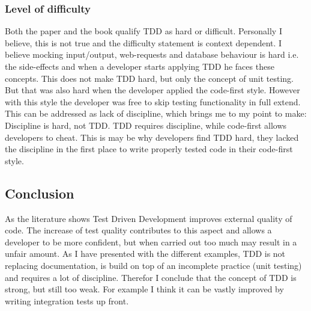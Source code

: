 \subsubsection*{Level of difficulty}

Both the paper and the book qualify TDD as hard or difficult. Personally I believe, this is not true and the
difficulty statement is context dependent. I believe mocking input/output, web-requests and database behaviour is hard
i.e. the side-effects and when a developer starts applying TDD he faces these concepts. This does not make TDD hard,
but only the concept of unit testing. But that was also hard when the developer applied the code-first style. However
with this style the developer was free to skip testing functionality in full extend. This can be addressed as lack of
discipline, which brings me to my point to make: Discipline is hard, not TDD. TDD requires discipline, while
code-first allows developers to cheat. This is may be why developers find TDD hard, they lacked the discipline in the
first place to write properly tested code in their code-first style.

\subsection*{Conclusion}

As the literature shows Test Driven Development improves external quality of code. The increase of test quality
contributes to this aspect and allows a developer to be more confident, but when carried out too much may result in a
unfair amount. As I have presented with the different examples, TDD is not replacing documentation, is build on top of
an incomplete practice (unit testing) and requires a lot of discipline. Therefor I conclude that the concept of TDD is
strong, but still too weak. For example I think it can be vastly improved by writing integration tests up front.
